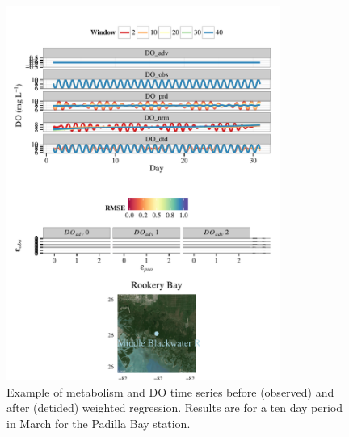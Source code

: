 \documentclass[letterpaper,12pt,oneside]{article}\usepackage[]{graphicx}\usepackage[]{color}
\newenvironment{knitrout}{}{} %
\begin{document}
\centering\vspace*{\fill}
\begin{knitrout}
\color{fgcolor}\begin{figure}[!ht]


{\centering \includegraphics[width=0.8\textwidth]{figure/case_ex3} 

}

\caption[Example of metabolism and \ac{DO} time series before (observed) and after (detided) weighted regression]{Example of metabolism and \ac{DO} time series before (observed) and after (detided) weighted regression. Results are for a ten day period in March for the Padilla Bay station.\label{fig:case_ex3}}
\end{figure}


\end{knitrout}
\vfill
\clearpage

\end{document}
